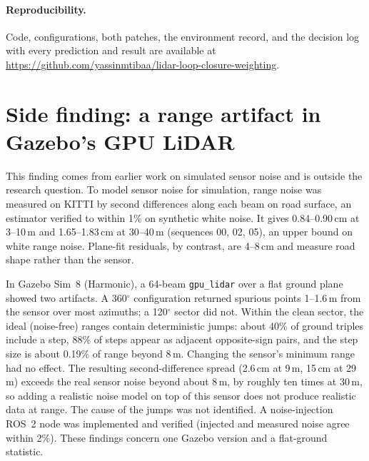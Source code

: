 \documentclass[11pt,a4paper]{article}
\begin{document}
\paragraph{Reproducibility.} Code, configurations, both patches, the environment record, and the decision log with
every prediction and result are available at \url{https://github.com/yassinmtibaa/lidar-loop-closure-weighting}.

\appendix
\section{Side finding: a range artifact in Gazebo's GPU LiDAR}
\label{app:gazebo}
This finding comes from earlier work on simulated sensor noise and is outside the research question. To model
sensor noise for simulation, range noise was measured on KITTI by second differences along each beam on road
surface, an estimator verified to within 1\% on synthetic white noise. It gives 0.84--0.90\,cm at 3--10\,m and
1.65--1.83\,cm at 30--40\,m (sequences 00, 02, 05), an upper bound on white range noise. Plane-fit residuals, by
contrast, are 4--8\,cm and measure road shape rather than the sensor.

In Gazebo Sim~8 (Harmonic), a 64-beam \texttt{gpu\_lidar} over a flat ground plane showed two artifacts. A
360$^\circ$ configuration returned spurious points 1--1.6\,m from the sensor over most azimuths; a 120$^\circ$
sector did not. Within the clean sector, the ideal (noise-free) ranges contain deterministic jumps: about 40\% of
ground triples include a step, 88\% of steps appear as adjacent opposite-sign pairs, and the step size is about
0.19\% of range beyond 8\,m. Changing the sensor's minimum range had no effect. The resulting second-difference
spread (2.6\,cm at 9\,m, 15\,cm at 29\,m) exceeds the real sensor noise beyond about 8\,m, by roughly ten times
at 30\,m, so adding a realistic noise model on top of this sensor does not produce realistic data at range. The
cause of the jumps was not identified. A noise-injection ROS~2 node was implemented and verified (injected and
measured noise agree within 2\%). These findings concern one Gazebo version and a flat-ground statistic.
\end{document}
